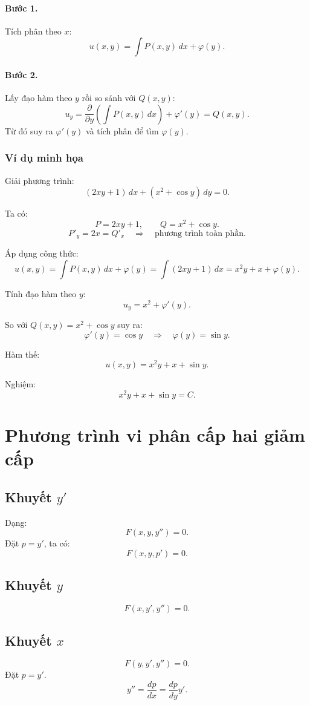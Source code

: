 \documentclass[12pt,a4paper]{article}
\begin{document}
\paragraph{Bước 1.} Tích phân theo $x$:
\[
u(x,y) = \int P(x,y)\,dx + \varphi(y).
\]

\paragraph{Bước 2.} Lấy đạo hàm theo $y$ rồi so sánh với $Q(x,y)$:
\[
u_y = \frac{\partial}{\partial y}\left(\int P(x,y)\,dx\right) + \varphi'(y)
= Q(x,y).
\]
Từ đó suy ra $\varphi'(y)$ và tích phân để tìm $\varphi(y)$.

\bigskip

\subsubsection*{Ví dụ minh họa}
Giải phương trình:
\[
(2xy + 1)\,dx + (x^2 + \cos y)\,dy = 0.
\]

Ta có:
\[
P=2xy+1,\qquad Q=x^2+\cos y.
\]
\[
P'_y = 2x = Q'_x \quad\Rightarrow\quad \text{phương trình toàn phần.}
\]

Áp dụng công thức:
\[
u(x,y)=\int P(x,y)\,dx + \varphi(y)
      = \int (2xy+1)\,dx
      = x^2 y + x + \varphi(y).
\]

Tính đạo hàm theo $y$:
\[
u_y = x^2 + \varphi'(y).
\]

So với $Q(x,y)=x^2+\cos y$ suy ra:
\[
\varphi'(y)=\cos y \quad\Rightarrow\quad \varphi(y)=\sin y.
\]

Hàm thế:
\[
u(x,y)=x^2 y + x + \sin y.
\]

Nghiệm:
\[
x^2 y + x + \sin y = C.
\]


\section{Phương trình vi phân cấp hai giảm cấp}

\subsection{Khuyết $y'$}
Dạng:
\[
F(x, y, y'') = 0.
\]
Đặt $p = y'$, ta có:
\[
F(x, y, p') = 0.
\]

\subsection{Khuyết $y$}
\[
F(x, y', y'') = 0.
\]

\subsection{Khuyết $x$}
\[
F(y, y', y'') = 0.
\]
Đặt $p = y'$.
\[
y'' = \frac{dp}{dx} = \frac{dp}{dy}y'.
\]
\end{document}
